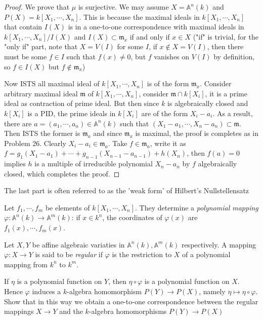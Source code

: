 \documentclass{solution}
\begin{document}
\begin{proof}
    We prove that $\mu$ is surjective. We may assume $X = \mathbb{A}^n(k)$ and $P(X) = k[X_1, \cdots, X_n]$. This is because the maximal ideals in $k[X_1, \cdots, X_n]$ that contain $I(X)$ is in a one-to-one correspondence with maximal ideals in $k[X_1, \cdots, X_n] / I(X)$ and $I(X) \subset \mathfrak{m}_x$ if and only if $x \in X$ ("if" is trivial, for the "only if" part, note that $X = V(I)$ for some $I$, if $x \notin X = V(I)$, then there must be some $f \in I$ such that $f(x) \ne 0$, but $f$ vanishes on $V(I)$ by definition, so $f \in I(X)$ but $f \notin \mathfrak{m}_x$)

    Now ISTS all maximal ideal of $k[X_1, \cdots, X_n]$ is of the form $\mathfrak{m}_x$. Consider arbitrary maximal ideal $\mathfrak{m}$ of $k[X_1, \cdots, X_n]$, consider $\mathfrak{m} \cap k[X_i]$, it is a prime ideal as contraction of prime ideal. But then since $k$ is algebraically closed and $k[X_i]$ is a PID, the prime ideals in $k[X_i]$ are of the form $X_i - a_i$. As a result, there are $a = (a_1, \cdots, a_n) \in \mathbb{A}^n(k)$ such that $(X_1 - a_1, \cdots, X_n - a_n) \subset \mathfrak{m}$. Then ISTS the former is $\mathfrak{m}_a$ and since $\mathfrak{m}_x$ is maximal, the proof is completes as in Problem 26. Clearly $X_i - a_i \in \mathfrak{m}_a$. Take $f \in \mathfrak{m}_a$, write it as $f = g_1(X_1 - a_1) + \cdots + g_{n - 1}(X_{n - 1} - a_{n - 1}) + h(X_n)$, then $f(a) = 0$ implies $h$ is a multiple of irreducible polynomial $X_n - a_n$ by $f$ algebraically closed, which completes the proof.
\end{proof}

{\color{red} The last part is often referred to as the 'weak form' of Hilbert's Nullstellensatz}

\begin{problem}
    Let $f_1, \cdots, f_m$ be elements of $k[X_1, \cdots, X_n]$. They determine a \textit{polynomial mapping} $\varphi: \mathbb{A}^n(k) \rightarrow \mathbb{A}^m(k)$: if $x \in k^n$, the coordinates of $\varphi(x)$ are $f_1(x), \cdots, f_m(x)$.

    Let $X, Y$ be affine algebraic variaties in $\mathbb{A}^n(k), \mathbb{A}^m(k)$ respectively. A mapping $\varphi: X \rightarrow Y$ is said to be \textit{regular} if $\varphi$ is the restriction to $X$ of a polynomial mapping from $k^n$ to $k^m$.

    If $\eta$ is a polynomial function on $Y$, then $\eta \circ \varphi$ is a polynomial function on $X$. Hence $\varphi$ induces a $k$-algebra homomorphism $P(Y) \rightarrow P(X)$, namely $\eta \mapsto \eta \circ \varphi$. Show that in this way we obtain a one-to-one correspondence between the regular mappings $X \rightarrow Y$ and the $k$-algebra homomorphisms $P(Y) \rightarrow P(X)$
\end{problem}
\end{document}
